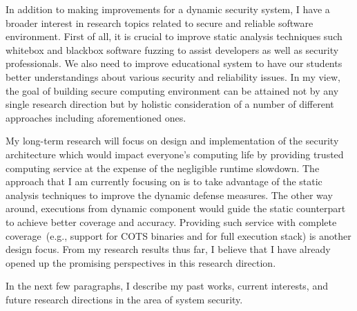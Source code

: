 \documentclass[letterpaper, 10pt]{article}
\begin{document}
\begin{small}
In addition to making improvements for a dynamic security system, I have a
broader interest in research topics related to secure and reliable software
environment.
%
First of all, it is crucial to improve static analysis techniques such whitebox
and blackbox software fuzzing to assist developers as well as security
professionals. 
%
We also need to improve educational system to have our students better
understandings about various security and reliability issues. 
%
In my view, the goal of building secure computing environment can be attained
not by any single research direction but by holistic consideration of a number
of different approaches including aforementioned ones.

My long-term research will focus on design and implementation of the security
architecture which would impact everyone's computing life by providing trusted
computing service at the expense of the negligible runtime slowdown.  
%
The approach that I am currently focusing on is to take advantage of the static
analysis techniques to improve the dynamic defense measures. 
%
The other way around, executions from dynamic component would guide the static
counterpart to achieve better coverage and accuracy.
%
%
Providing such service with complete coverage~(e.g., support for COTS binaries
and for full execution stack) is another design focus.
%
From my research results thus far, I believe that I have already opened up the
promising perspectives in this research direction.

In the next few paragraphs, I describe my past works, current interests, and
future research directions in the area of system security.


\end{small}
\end{document}

